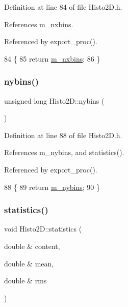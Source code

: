 Definition at line 84 of file Histo2\+D.\+h.



References m\+\_\+nxbins.



Referenced by export\+\_\+proc().


\begin{DoxyCode}
84                         \{  
85     \textcolor{keywordflow}{return} \hyperlink{classHisto2D_a39a9d29010bf81c546a1ad1b01f7cb43}{m\_nxbins};
86   \}
\end{DoxyCode}
\mbox{\label{classHisto2D_a17ee49d9e1c5d62edc887f4f63f68db6}} 
\subsubsection{\texorpdfstring{nybins()}{nybins()}}
{\footnotesize\ttfamily unsigned long Histo2\+D\+::nybins (\begin{DoxyParamCaption}{ }\end{DoxyParamCaption})\hspace{0.3cm}{\ttfamily [inline]}}



Definition at line 88 of file Histo2\+D.\+h.



References m\+\_\+nybins, and statistics().



Referenced by export\+\_\+proc().


\begin{DoxyCode}
88                         \{  
89     \textcolor{keywordflow}{return} \hyperlink{classHisto2D_afebeb164369fa9cea59f226d71907e3d}{m\_nybins};
90   \}
\end{DoxyCode}
\mbox{\label{classHisto2D_a66875cb46a7e5ff6fa347fe736cbed1b}} 
\subsubsection{\texorpdfstring{statistics()}{statistics()}}
{\footnotesize\ttfamily void Histo2\+D\+::statistics (\begin{DoxyParamCaption}\item[{double \&}]{content,  }\item[{double \&}]{mean,  }\item[{double \&}]{rms }\end{DoxyParamCaption})}



